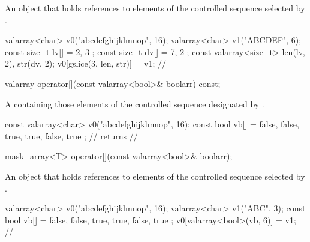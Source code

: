 \begin{itemdescr}
\pnum
\returns An object that holds references to elements of the controlled
sequence selected by . \begin{example}
\begin{codeblock}
valarray<char> v0("abcdefghijklmnop", 16);
valarray<char> v1("ABCDEF", 6);
const size_t lv[] = { 2, 3 };
const size_t dv[] = { 7, 2 };
const valarray<size_t> len(lv, 2), str(dv, 2);
v0[gslice(3, len, str)] = v1;
// 
\end{codeblock}
\end{example}
\end{itemdescr}

%
\begin{itemdecl}
valarray operator[](const valarray<bool>& boolarr) const;
\end{itemdecl}

\begin{itemdescr}
\pnum
\returns A  containing those
elements of the controlled sequence designated by .
\begin{example}
\begin{codeblock}
const valarray<char> v0("abcdefghijklmnop", 16);
const bool vb[] = { false, false, true, true, false, true };
//  returns
// 
\end{codeblock}
\end{example}
\end{itemdescr}

%
\begin{itemdecl}
mask_array<T> operator[](const valarray<bool>& boolarr);
\end{itemdecl}

\begin{itemdescr}
\pnum
\returns An object that holds references to elements of the controlled
sequence selected by . \begin{example}
\begin{codeblock}
valarray<char> v0("abcdefghijklmnop", 16);
valarray<char> v1("ABC", 3);
const bool vb[] = { false, false, true, true, false, true };
v0[valarray<bool>(vb, 6)] = v1;
// 
\end{codeblock}
\end{example}
\end{itemdescr}

